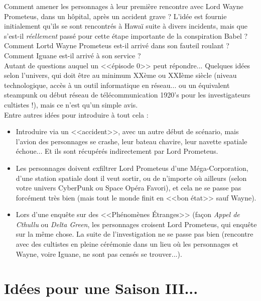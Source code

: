 \documentclass[11pt,twoside,a4paper]{book}
\begin{document}
Comment amener les personnages {\`a} leur premi{\`e}re rencontre avec Lord Wayne Prometeus, dans un h{\^o}pital, apr{\`e}s un accident grave ? L'id{\'e}e est fournie initialement qu'ils se sont rencontr{\'e}s {\`a} Hawa{\"i} suite {\`a} divers incidents, mais que s'est-il \emph{r{\'e}ellement} pass{\'e} pour cette {\'e}tape importante de la conspiration Babel ? Comment Lortd Wayne Prometeus est-il arriv{\'e} dans son fauteil roulant ? Comment Iguane est-il arriv{\'e} {\`a} son service ? ~\\

Autant de questions auquel un <<{\'e}pisode 0>> peut r{\'e}pondre... Quelques id{\'e}es selon l'univers, qui doit {\^e}tre au minimum XX{\`e}me ou XXI{\`e}me si{\`e}cle (niveau technologique, acc{\`e}s {\`a} un outil informatique en r{\'e}seau... ou un équivalent steampunk ou début réseau de télécommunication 1920's pour les investigateurs cultistes !), mais ce n'est qu'un simple avis. ~\\

Entre autres id{\'e}es pour introduire {\`a} tout cela : 
\begin{itemize}
	\item Introduire via un <<accident>>, avec un autre d{\'e}but de sc{\'e}nario, mais l'avion des personnages se crashe, leur bateau chavire, leur navette spatiale {\'e}choue... Et ils sont r{\'e}cup{\'e}r{\'e}s indirectement par Lord Prometeus. 
	\item Les personnages doivent exfiltrer Lord Prometeus d'une M{\'e}ga-Corporation, d'une station spatiale dont il veut sortir, ou de n'importe o{\`u} ailleurs (selon votre univers CyberPunk ou Space Op{\'e}ra Favori), et cela ne se passe pas forc{\'e}ment tr{\`e}s bien (mais tout le monde finit en <<bon {\'e}tat>> sauf Wayne). 
	\item Lors d'une enqu{\^e}te sur des <<Ph{\'e}nom{\`e}nes {\'E}tranges>> (fa\c{c}on \emph{Appel de Cthullu} ou \emph{Delta Green}, les personnages croisent Lord Prometeus, qui enqu{\^e}te sur la m{\^e}me chose. La suite de l'investigation ne se passe pas bien (rencontre avec des cultistes en pleine c{\'e}r{\'e}monie dans un lieu o{\`u} les personnages et Wayne, voire Iguane, ne sont pas cens{\'e}s se trouver...). 
\end{itemize}

\clearpage

\section*{Id{\'e}es pour une Saison III...}
\end{document}
